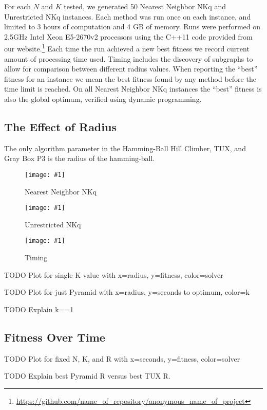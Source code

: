 \documentclass{sig-alternate}
\newcommand{\includegraphicsfit}[1]
{\texttt{[image: \#1]}}
\begin{document}
For each $N$ and $K$ tested, we generated 50 Nearest Neighbor NKq and Unrestricted NKq instances.
Each method was run once on each instance, and limited to 3 hours of computation and 4 GB of memory.
Runs were performed on 2.5GHz Intel Xeon E5-2670v2 processors using the C++11 code provided
from our website.\footnote{\url{https://github.com/name_of_repository/anonymous_name_of_project}}
Each time the run achieved a new best fitness we record current amount of processing time used.
Timing includes the discovery of subgraphs to allow for comparison between different radius values.
When reporting the ``best'' fitness for an instance we mean the best fitness found by any method before
the time limit is reached. On all Nearest Neighbor NKq instances the ``best'' fitness
is also the global optimum, verified using dynamic programming.


\subsection{The Effect of Radius}
The only algorithm parameter in the Hamming-Ball Hill Climber, TUX, and Gray Box P3
is the radius of the hamming-ball.

\begin{figure}
  \centering
  \includegraphicsfit{fitness-nn}
  \caption{Nearest Neighbor NKq}
  \label{fig-fitness-nn}
\end{figure}

\begin{figure}
  \centering
  \includegraphicsfit{fitness-un}
  \caption{Unrestricted NKq}
  \label{fig-fitness-un}
\end{figure}

\begin{figure}
  \centering
  \includegraphicsfit{p3-seconds}
  \caption{Timing}
  \label{fig-p3-seconds}
\end{figure}

TODO Plot for single K value with x=radius, y=fitness, color=solver

TODO Plot for just Pyramid with x=radius, y=seconds to optimum, color=k

TODO Explain k==1

\subsection{Fitness Over Time}
TODO Plot for fixed N, K, and R with x=seconds, y=fitness, color=solver

TODO Explain best Pyramid R versus best TUX R.
\end{document}
